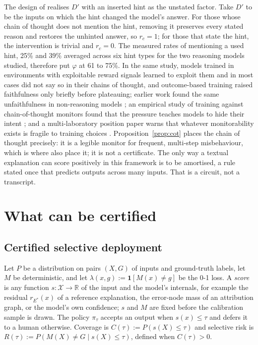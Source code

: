 \documentclass[11pt,letterpaper]{article}
\newcommand{\X}{\mathcal{X}}
\newcommand{\D}{D}
\newcommand{\R}{\mathbb{R}}
\newcommand{\ind}[1]{\mathbf{1}[#1]}
\theoremstyle{plain}
\theoremstyle{definition}
\theoremstyle{remark}
\begin{document}
The design of \citet{chen2025reasoning} realises $\D'$ with an inserted hint as the unstated factor. Take $\D'$ to be the inputs on which the hint changed the model's answer. For those whose chain of thought does not mention the hint, removing it preserves every stated reason and restores the unhinted answer, so $r_c=1$; for those that state the hint, the intervention is trivial and $r_c=0$. The measured rates of mentioning a used hint, 25\% and 39\% averaged across six hint types for the two reasoning models studied, therefore put $\varphi$ at 61 to 75\%. In the same study, models trained in environments with exploitable reward signals learned to exploit them and in most cases did not say so in their chains of thought, and outcome-based training raised faithfulness only briefly before plateauing; earlier work found the same unfaithfulness in non-reasoning models \citep{turpin2023}; an empirical study of training against chain-of-thought monitors found that the pressure teaches models to hide their intent \citep{baker2025monitoring}; and a multi-laboratory position paper warns that whatever monitorability exists is fragile to training choices \citep{korbak2025}. Proposition~\ref{prop:cot} places the chain of thought precisely: it is a legible monitor for frequent, multi-step misbehaviour, which is where \citet{chen2025reasoning} also place it; it is not a certificate. The only way a textual explanation can score positively in this framework is to be amortised, a rule stated once that predicts outputs across many inputs. That is a circuit, not a transcript.

\section{What can be certified}
\label{sec:certify}

\subsection{Certified selective deployment}

Let $P$ be a distribution on pairs $(X,G)$ of inputs and ground-truth labels, let $M$ be deterministic, and let $\lambda(x,g):=\ind{M(x)\neq g}$ be the 0-1 loss. A \emph{score} is any function $s:\X\to\R$ of the input and the model's internals, for example the residual $r_{E^{*}}(x)$ of a reference explanation, the error-node mass of an attribution graph, or the model's own confidence; $s$ and $M$ are fixed before the calibration sample is drawn. The policy $\pi_\tau$ accepts an output when $s(x)\le\tau$ and defers it to a human otherwise. Coverage is $C(\tau):=P(s(X)\le\tau)$ and selective risk is $R(\tau):=P(M(X)\neq G\mid s(X)\le\tau)$, defined when $C(\tau)>0$.
\end{document}
